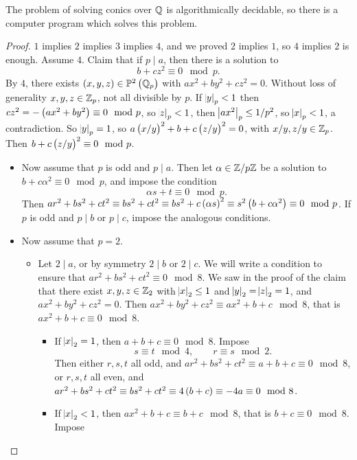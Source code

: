 The problem of solving conics over $ \mathbb{Q} $ is algorithmically decidable, so there is a computer program which solves this problem.

\pagebreak

\begin{proof}
$ 1 $ implies $ 2 $ implies $ 3 $ implies $ 4 $, and we proved $ 2 $ implies $ 1 $, so $ 4 $ implies $ 2 $ is enough. Assume $ 4 $. Claim that if $ p \mid a $, then there is a solution to
$$ b + cz^2 \equiv 0 \mod p. $$
By $ 4 $, there exists $ \br{x, y, z} \in \PP^2\br{\QQ_p} $ with $ ax^2 + by^2 + cz^2 = 0 $. Without loss of generality $ x, y, z \in \mathbb{Z}_p $, not all divisible by $ p $. If $ \abs{y}_p < 1 $ then $ cz^2 = -\br{ax^2 + by^2} \equiv 0 \mod p $, so $ \abs{z}_p < 1 $, then $ \abs{ax^2}_p \le 1 / p^2 $, so $ \abs{x}_p < 1 $, a contradiction. So $ \abs{y}_p = 1 $, so $ a\br{x / y}^2 + b + c\br{z / y}^2 = 0 $, with $ x / y, z / y \in \mathbb{Z}_p $. Then $ b + c\br{z / y}^2 \equiv 0 \mod p $.
\begin{itemize}
\item Now assume that $ p $ is odd and $ p \mid a $. Then let $ \alpha \in \mathbb{Z} / p\mathbb{Z} $ be a solution to $ b + c\alpha^2 \equiv 0 \mod p $, and impose the condition
$$ \alpha s + t \equiv 0 \mod p. $$
Then $ ar^2 + bs^2 + ct^2 \equiv bs^2 + ct^2 \equiv bs^2 + c\br{\alpha s}^2 \equiv s^2\br{b + c\alpha^2} \equiv 0 \mod p $. If $ p $ is odd and $ p \mid b $ or $ p \mid c $, impose the analogous conditions.
\item Now assume that $ p = 2 $.
\begin{itemize}
\item Let $ 2 \mid a $, or by symmetry $ 2 \mid b $ or $ 2 \mid c $. We will write a condition to ensure that $ ar^2 + bs^2 + ct^2 \equiv 0 \mod 8 $. We saw in the proof of the claim that there exist $ x, y, z \in \mathbb{Z}_2 $ with $ \abs{x}_2 \le 1 $ and $ \abs{y}_2 = \abs{z}_2 = 1 $, and $ ax^2 + by^2 + cz^2 = 0 $. Then $ ax^2 + by^2 + cz^2 \equiv ax^2 + b + c \mod 8 $, that is $ ax^2 + b + c \equiv 0 \mod 8 $.
\begin{itemize}
\item If $ \abs{x}_2 = 1 $, then $ a + b + c \equiv 0 \mod 8 $. Impose
$$ s \equiv t \mod 4, \qquad r \equiv s \mod 2. $$
Then either $ r, s, t $ all odd, and $ ar^2 + bs^2 + ct^2 \equiv a + b + c \equiv 0 \mod 8 $, or $ r, s, t $ all even, and $ ar^2 + bs^2 + ct^2 \equiv bs^2 + ct^2 \equiv 4\br{b + c} \equiv -4a \equiv 0 \mod 8 $.
\item If $ \abs{x}_2 < 1 $, then $ ax^2 + b + c \equiv b + c \mod 8 $, that is $ b + c \equiv 0 \mod 8 $. Impose

\end{itemize}
\end{itemize}
\end{itemize}
\end{proof}
